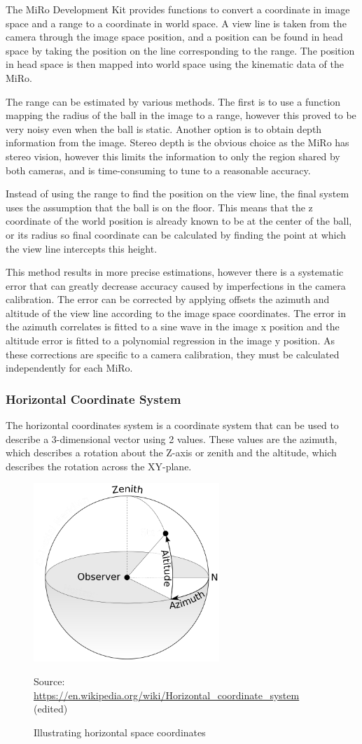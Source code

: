 The MiRo Development Kit provides functions to convert a coordinate in image space and a range to a coordinate in world space. A view line is taken from the camera through the image space position, and a position can be found in head space by taking the position on the line corresponding to the range. The position in head space is then mapped into world space using the kinematic data of the MiRo. 

The range can be estimated by various methods. The first is to use a function mapping the radius of the ball in the image to a range, however this proved to be very noisy even when the ball is static. Another option is to obtain depth information from the image. Stereo depth is the obvious choice as the MiRo has stereo vision, however this limits the information to only the region shared by both cameras, and is time-consuming to tune to a reasonable accuracy. 

Instead of using the range to find the position on the view line, the final system uses the assumption that the ball is on the floor. This means that the z coordinate of the world position is already known to be at the center of the ball, or its radius so final coordinate can be calculated by finding the point at which the view line intercepts this height. 

This method results in more precise estimations, however there is a systematic error that can greatly decrease accuracy caused by imperfections in the camera calibration. The error can be corrected by applying offsets the azimuth and altitude of the view line according to the image space coordinates. 
The error in the azimuth correlates is fitted to a sine wave in the image x position and the altitude error is fitted to a polynomial regression in the image y position. As these corrections are specific to a camera calibration, they must be calculated independently for each MiRo. 

\subsubsection{Horizontal Coordinate System}

The horizontal coordinates system is a coordinate system that can be used to describe a 3-dimensional vector using 2 values. These values are the azimuth, which describes a rotation about the Z-axis or zenith and the altitude, which describes the rotation across the XY-plane.

\begin{figure}[H]
    \centering
    \includegraphics[width=7cm]{images/azal.png}
    \caption{Illustrating horizontal space coordinates}
    \label{fig:horizontal coordinates}
    Source: \url{https://en.wikipedia.org/wiki/Horizontal_coordinate_system} (edited)
\end{figure}

